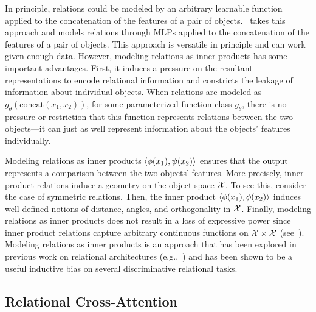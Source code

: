 In principle, relations could be modeled by an arbitrary learnable function applied to the concatenation of the features of a pair of objects.~\citep{santoro1} takes this approach and models relations through MLPs applied to the concatenation of the features of a pair of objects. This approach is versatile in principle and can work given enough data. However, modeling relations as inner products has some important advantages. First, it induces a pressure on the resultant representations to encode relational information and constricts the leakage of information about individual objects. When relations are modeled as $g_\theta(\mathrm{concat}(x_1, x_2))$, for some parameterized function class $g_\theta$, there is no pressure or restriction that this function represents relations between the two objects---it can just as well represent information about the objects' features individually.

Modeling relations as inner products $\left \langle \phi(x_1), \psi(x_2) \right\rangle$ ensures that the output represents a comparison between the two objects' features. More precisely, inner product relations induce a geometry on the object space ${\mathcal{X}}$. To see this, consider the case of symmetric relations. Then, the inner product $\left \langle \phi(x_1), \phi(x_2) \right\rangle$ induces well-defined notions of distance, angles, and orthogonality in ${\mathcal{X}}$. Finally, modeling relations as inner products does not result in a loss of expressive power since inner product relations capture arbitrary continuous functions on ${\mathcal{X}} \times {\mathcal{X}}$ (see~). Modeling relations as inner products is an approach that has been explored in previous work on relational architectures (e.g.,~\citep{esbn,kerg2022neural}) and has been shown to be a useful inductive bias on several discriminative relational tasks.

\subsection{Relational Cross-Attention}\label{ssec:relational_crossattention}

